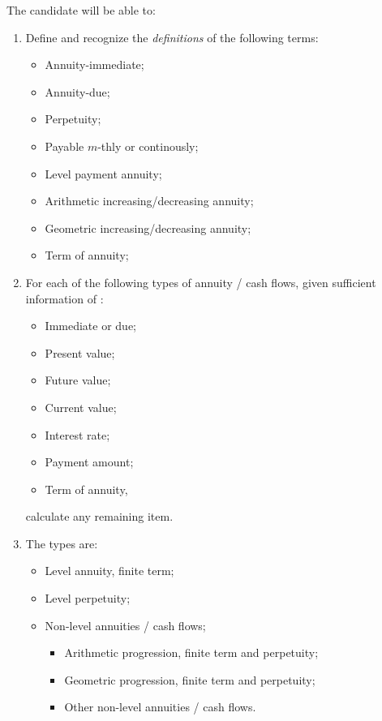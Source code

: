 \begin{outcomes}
The candidate will be able to:
\begin{enumerate}[label = \alph*), leftmargin = *]
	\item	Define and recognize the \textit{definitions} of the following terms:
		\begin{itemize}[leftmargin = *]
		\item	Annuity-immediate;
		\item	Annuity-due;
		\item	Perpetuity;
		\item	Payable $m$-thly or continously;
		\item	Level payment annuity;
		\item	Arithmetic increasing/decreasing annuity;
		\item	Geometric increasing/decreasing annuity;
		\item	Term of annuity;
		\end{itemize}
	\item	For each of the following types of annuity / cash flows, given sufficient information of :
		\begin{itemize}[leftmargin = *]
		\item	Immediate or due;
		\item	Present value;
		\item	Future value;
		\item	Current value;
		\item	Interest rate;
		\item	Payment amount;
		\item	Term of annuity,
		\end{itemize}
		calculate any remaining item. 
	\item[]	The types are:
		\begin{itemize}[leftmargin = *]
		\item	Level annuity, finite term;
		\item	Level perpetuity;
		\item	Non-level annuities / cash flows;
			\begin{itemize}[leftmargin = *]
			\item	Arithmetic progression, finite term and perpetuity;
			\item	Geometric progression, finite term and perpetuity;
			\item	Other non-level annuities / cash flows.
			\end{itemize}
		\end{itemize}
\end{enumerate}
\end{outcomes}

